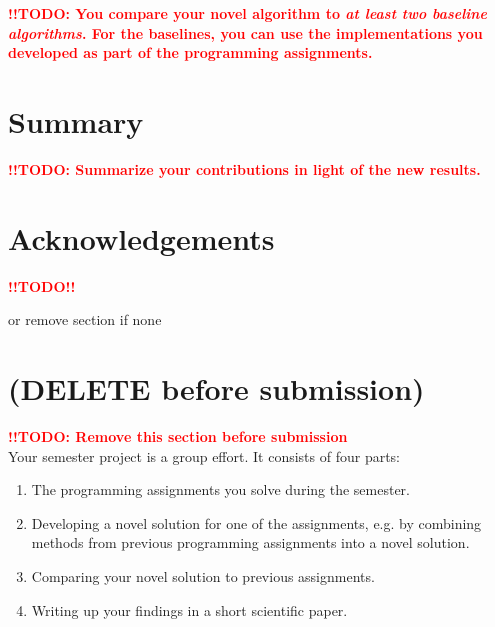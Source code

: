\documentclass[10pt,conference,compsocconf]{IEEEtran}
\newcommand{\todo}{\textcolor{red}{\textbf{!!TODO!!}}}
\newcommand{\todoThis}[1]{\textcolor{red}{\textbf{!!TODO: #1}}}
\begin{document}
\todoThis{You compare your novel algorithm to \emph{at least two baseline
  algorithms}. For the baselines, you can use the implementations you
developed as part of the programming assignments.\\}
  
\section{Summary}\label{sec:summary}
\todoThis{Summarize your contributions in light of the new
  results.}

\section*{Acknowledgements}
\todo

or remove section if none



\section{(DELETE before submission)}
\todoThis{Remove this section before submission}\\

Your semester project is a group effort. It consists of four parts:
\begin{enumerate}
\item The programming assignments you solve during the semester.
\item Developing a novel solution for one of the assignments, e.g. by
  combining methods from previous programming assignments into a novel
  solution.
\item Comparing your novel solution to previous assignments.
\item Writing up your findings in a short scientific paper.
\end{enumerate}
\end{document}
